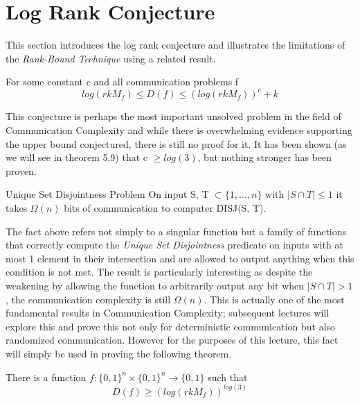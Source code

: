 \documentclass[usletter]{article}
\begin{document}
\section{Log Rank Conjecture}
This section introduces the log rank conjecture and illustrates the limitations of the \emph {Rank-Bound Technique} using a related result. 

\begin {conjecture}
For some constant c and all communication problems f 
$$ log (rk M_f) \leq D(f) \leq {(log (rk M_f))}^c + k $$
\end {conjecture}

\begin{remark}
This conjecture is perhaps the most important unsolved problem in the field of Communication Complexity and while there is overwhelming evidence supporting the upper bound conjectured, there is still no proof for it. It has been shown (as we will see in theorem 5.9) that c $\geq log(3)$, but nothing stronger has been proven. 
\end{remark}

\begin{fact}
Unique Set Disjointness Problem \newline
On input S, T $\subset \{1, ... ,n\}$ with $\lvert S \cap T \rvert \leq 1$ it takes $\Omega(n)$ bits of communication to computer DISJ(S, T). 
\end{fact}

\begin{remark}
The fact above refers not simply to a singular function but a family of functions that correctly compute the \emph{Unique Set Disjointness} predicate on inputs with at most 1 element in their intersection and are allowed to output anything when this condition is not met. \newline
The result is particularly interesting as despite the weakening by allowing the function to arbitrarily output any bit when $\lvert S \cap T \rvert > 1$, the communication complexity is still $\Omega(n)$. \newline
This is actually one of the most fundamental results in Communication Complexity; subsequent lectures will explore this and prove this not only for deterministic communication but also randomized communication. However for the purposes of this lecture, this fact will simply be used in proving the following theorem. 
\end {remark}

\begin {theorem}
There is a function $f: {\{0, 1\}}^n \times {\{0, 1\}}^n \rightarrow \{0, 1\}$ such that
$$ D(f) \geq {(log (rk M_f))}^{log (3)} $$ 
\end{theorem}
\end{document}
